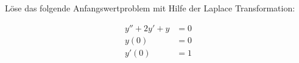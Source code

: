 
Löse das folgende Anfangswertproblem mit Hilfe der Laplace Transformation:

\begin{align}
	y''+2y'+y&=0\\
	y(0)&=0\\
	y'(0)&=1
\end{align}